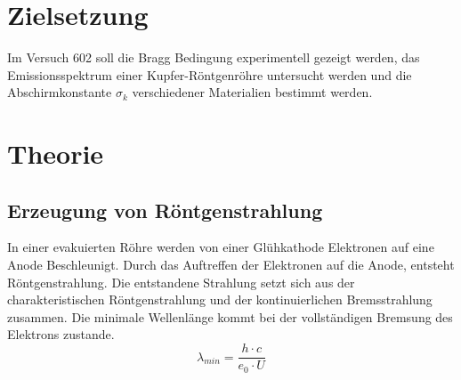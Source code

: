 \section{Zielsetzung}
\label{sec:Zielsetzung}

Im Versuch 602 soll die Bragg Bedingung experimentell gezeigt werden, das Emissionsspektrum einer Kupfer-Röntgenröhre untersucht werden
und die Abschirmkonstante $σ_k$ verschiedener Materialien bestimmt werden.

\section{Theorie}
\label{sec:Theorie}

\subsection{Erzeugung von Röntgenstrahlung}
\label{sec:Erzeugung_von_Roentgenstrahlung}

In einer evakuierten Röhre werden von einer Glühkathode Elektronen auf eine Anode Beschleunigt. 
Durch das Auftreffen der Elektronen auf die Anode, entsteht Röntgenstrahlung. Die entstandene Strahlung
setzt sich aus der charakteristischen Röntgenstrahlung und der kontinuierlichen Bremsstrahlung zusammen. 
Die minimale Wellenlänge kommt bei der vollständigen Bremsung des Elektrons zustande.\\
\begin{equation}\label{eq:lambda_min}
    \lambda_{min} = \frac{h \cdot c}{e_0 \cdot U}
\end{equation}

